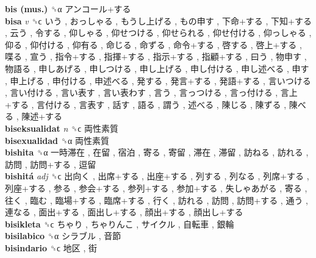 \textbf{bis (mus.)} ␝α   アンコール+する   \\
\textbf{bisa} \emph{v}  ␝ϲ   いう ,  おっしゃる ,  もうし上げる ,  もの申す ,  下命+する ,  下知+する ,  云う ,  令する ,  仰しゃる ,  仰せつける ,  仰せられる ,  仰せ付ける ,  仰っしゃる ,  仰る ,  仰付ける ,  仰有る ,  命じる ,  命ずる ,  命令+する ,  啓する ,  啓上+する ,  喋る ,  宣う ,  指令+する ,  指揮+する ,  指示+する ,  指顧+する ,  曰う ,  物申す ,  物語る ,  申しあげる ,  申しつける ,  申し上げる ,  申し付ける ,  申し述べる ,  申す ,  申上げる ,  申付ける ,  申述べる ,  発する ,  発言+する ,  発語+する ,  言いつける ,  言い付ける ,  言い表す ,  言い表わす ,  言う ,  言っつける ,  言っ付ける ,  言上+する ,  言付ける ,  言表す ,  話す ,  語る ,  謂う ,  述べる ,  陳じる ,  陳ずる ,  陳べる ,  陳述+する   \\
\textbf{biseksualidat} \emph{n}  ␝ϲ   両性素質   \\
\textbf{bisexualidad} ␝α   両性素質   \\
\textbf{bishita} ␝α   一時滞在 ,  在留 ,  宿泊 ,  寄る ,  寄留 ,  滞在 ,  滞留 ,  訪ねる ,  訪れる ,  訪問 ,  訪問+する ,  逗留   \\
\textbf{bishitá} \emph{adj}  ␝ϲ   出向く ,  出席+する ,  出座+する ,  列する ,  列なる ,  列席+する ,  列座+する ,  参る ,  参会+する ,  参列+する ,  参加+する ,  失しゃあがる ,  寄る ,  往く ,  臨む ,  臨場+する ,  臨席+する ,  行く ,  訪れる ,  訪問 ,  訪問+する ,  通う ,  連なる ,  面出+する ,  面出し+する ,  顔出+する ,  顔出し+する   \\
\textbf{bisikleta} ␝ϲ   ちゃり ,  ちゃりんこ ,  サイクル ,  自転車 ,  銀輪   \\
\textbf{bisilabico} ␝α   シラブル ,  音節   \\
\textbf{bisindario} ␝ϲ   地区 ,  街   \\
